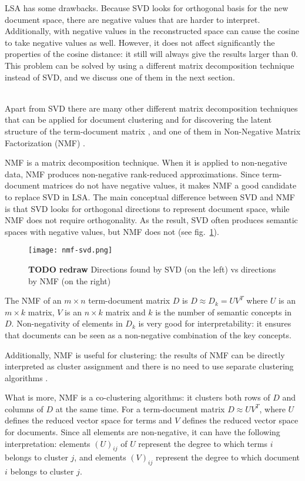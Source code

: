 LSA has some drawbacks. Because SVD looks for orthogonal basis
for the new document space, there are negative values that are harder
to interpret. Additionally, with negative values in the reconstructed
space can cause the cosine to take negative values as well.
However, it does not affect significantly the properties of the
cosine distance: it still will always give the results larger than 0.
This problem can be solved by using a different matrix decomposition
technique instead of SVD, and we discuss one of them in the next
section.


\ \\

Apart from SVD there are many other different matrix decomposition
techniques that can be applied for document clustering and for discovering
the latent structure of the term-document matrix \cite{osinski2006improving},
and one of them in Non-Negative Matrix Factorization (NMF) \cite{lee1999nnmf}.


NMF is a matrix decomposition technique. When it is applied to non-negative
data, NMF produces non-negative rank-reduced approximations.
Since term-document matrices do not have negative values, it makes
NMF a good candidate to replace SVD in LSA. The main conceptual difference
between SVD and NMF is that SVD looks for orthogonal directions to
represent document space, while NMF does not require orthogonality.
As the result, SVD often produces semantic spaces with negative values,
but NMF does not \cite{xu2003document} (see fig.~\ref{fig:nmf-svd}).


\begin{figure}[h]
\centering\texttt{[image: nmf-svd.png]}
\caption{\textbf{TODO redraw} Directions found by  SVD (on the left) vs directions by NMF (on the right)}
\label{fig:nmf-svd}
\end{figure}


The NMF of an $m \times n$ term-document matrix $D$ is $D \approx D_k = U  V^T$
where $U$ is an $m \times k$ matrix, $V$ is an $n \times k$ matrix and
$k$ is the number of semantic concepts in $D$.
Non-negativity of elements in $D_k$ is very good for interpretability: it
ensures that documents can be seen as a non-negative combination of
the key concepts.


Additionally, NMF is useful for clustering: the results of NMF can
be directly interpreted as cluster assignment and there is no need
to use separate clustering algorithms \cite{xu2003document}.

What is more, NMF is a co-clustering algorithms: it clusters both
rows of $D$ and columns of $D$ at the same time. For a term-document
matrix $D \approx U V^T$, where $U$ defines the reduced vector space for terms
and $V$ defines the reduced vector space for documents. Since all elements
are non-negative, it can have the following interpretation:
elements $(U)_{ij}$ of $U$ represent the degree to which terms $i$ belongs to cluster $j$,
and elements $(V)_{ij}$ represent the degree to which document $i$ belongs to cluster $j$.

